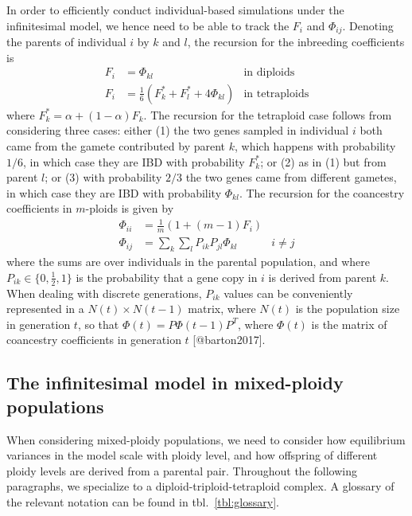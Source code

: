 In order to efficiently conduct individual-based simulations under the
infinitesimal model, we hence need to be able to track the \(F_i\) and
\(\Phi_{ij}\). Denoting the parents of individual \(i\) by \(k\) and
\(l\), the recursion for the inbreeding coefficients is \begin{align}
    F_i &= \Phi_{kl}& \text{in diploids} \nonumber \\  
    F_i &= \frac1 6 (F_k^\ast + F_l^\ast + 4\Phi_{kl}) & \text{in tetraploids} 
    \label{eq:recursion}
\end{align} where \(F_k^\ast = \alpha + (1-\alpha)F_k\). The recursion
for the tetraploid case follows from considering three cases: either (1)
the two genes sampled in individual \(i\) both came from the gamete
contributed by parent \(k\), which happens with probability \(1/6\), in
which case they are IBD with probability \(F_k^\ast\); or (2) as in (1)
but from parent \(l\); or (3) with probability \(2/3\) the two genes
came from different gametes, in which case they are IBD with probability
\(\Phi_{kl}\). The recursion for the coancestry coefficients in
\(m\)-ploids is given by \begin{align}
    \Phi_{ii} &= \frac1 m \left(1 + (m-1)F_i\right) \nonumber \\
    \Phi_{ij} &= \sum_k \sum_l P_{ik}P_{jl} \Phi_{kl} & i \ne j 
    \label{eq:coancestry}
\end{align} where the sums are over individuals in the parental
population, and where \(P_{ik} \in \{0, \frac1 2, 1\}\) is the
probability that a gene copy in \(i\) is derived from parent \(k\). When
dealing with discrete generations, \(P_{ik}\) values can be conveniently
represented in a \(N(t) \times N(t-1)\) matrix, where \(N(t)\) is the
population size in generation \(t\), so that
\(\Phi(t) = P \Phi(t-1) P^T\), where \(\Phi(t)\) is the matrix of
coancestry coefficients in generation \(t\) {[}@barton2017{]}.

\hypertarget{the-infinitesimal-model-in-mixed-ploidy-populations}{%
\subsection{The infinitesimal model in mixed-ploidy
populations}\label{the-infinitesimal-model-in-mixed-ploidy-populations}}

When considering mixed-ploidy populations, we need to consider how
equilibrium variances in the model scale with ploidy level, and how
offspring of different ploidy levels are derived from a parental pair.
Throughout the following paragraphs, we specialize to a
diploid-triploid-tetraploid complex. A glossary of the relevant notation
can be found in tbl.~\ref{tbl:glossary}.

